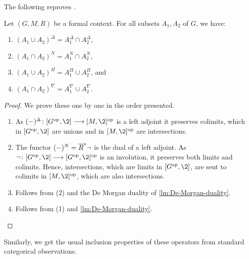 The following reproves \cite[5.1]{dubois-dupin-prade_2007}. 

\begin{proposition}
    Let $(G,M,R)$ be a formal context. For all subsets $A_1, A_2$ of $G$, we have: 
    \begin{enumerate}
        \item $(A_1\cup A_2)^\Delta = A_1^\Delta \cap A_2^\Delta$,
        \item $(A_1\cap A_2)^N = A_1^N \cap A_2^N$,
        \item $(A_1\cup A_2)^\Pi = A_1^\Pi \cup A_2^\Pi$, and
        \item $(A_1\cap A_2)^\nabla = A_1^\nabla \cup A_2^\nabla$.
    \end{enumerate}
\end{proposition}
\begin{proof}
    We prove these one by one in the order presented. 
    \begin{enumerate}
        \item As $(-)^\Delta\: [G\op, \2]\to [M,\2]\op$ is a left adjoint it preserves colimits, which in $[G\op,\2]$ are unions and in $[M,\2]\op$ are intersections. 
        \item The functor $(-)^N = \overline{R}^*\neg$ is the dual of a left adjoint. As $\neg\: [G\op, \2]\to [G\op, \2]\op$ is an involution, it preserves both limits and colimits. Hence, intersections, which are limits in $[G\op, \2]$, are sent to colimits in $[M,\2]\op$, which are also intersections.
        \item Follows from (2) and the De Morgan duality of \cref{lm:De-Morgan-duality}.
        \item Follows from (1) and \cref{lm:De-Morgan-duality}. 
    \end{enumerate}
\end{proof}

Similarly, we get the usual inclusion properties of these operators from standard categorical observations. 

